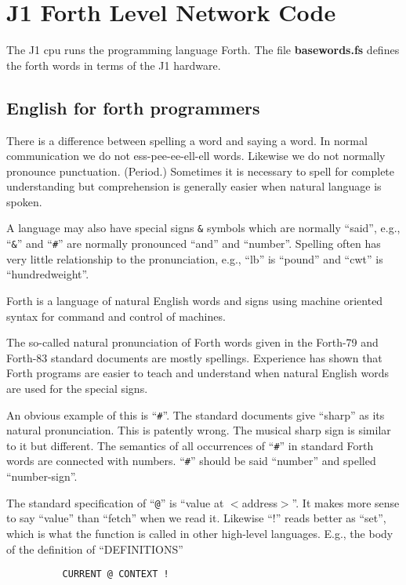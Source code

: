 \chapter{J1 Forth Level Network Code}
The J1 cpu runs the programming language Forth. The file {\bf basewords.fs}
defines the forth words in terms of the J1 hardware.

\section{English for forth programmers \cite{64}}

There is a difference between spelling a word and saying a word.  In
normal communication we do not ess-pee-ee-ell-ell words.  Likewise we
do not normally pronounce punctuation.  (Period.)  Sometimes it is
necessary to spell for complete understanding but comprehension is
generally easier when natural language is spoken.

A language may also have special signs \verb|&| symbols which are normally
``said'', e.g., ``\verb|&|'' and ``\verb|#|'' are normally pronounced
``and'' and ``number''.  Spelling often has very little relationship to
the pronunciation, e.g., ``lb'' is ``pound'' and ``cwt'' is ``hundredweight''.

Forth is a language of natural English words and signs using
machine  oriented  syntax for command and control of machines.

The so-called natural pronunciation of Forth words given in the
Forth-79 and Forth-83 standard documents are mostly spellings.
Experience has shown that Forth programs are easier to teach and
understand when natural English words are used for the special signs.

An obvious example of this is ``\verb|#|''.  The standard documents
give  ``sharp''  as  its natural pronunciation.  This is patently
wrong.  The musical sharp sign is similar to it but  different.
The semantics of all occurrences of ``\verb|#|'' in standard Forth words
are connected with numbers.  ``\verb|#|'' should be  said  ``number''  and
spelled ``number-sign''.

The standard specification of ``\verb|@|'' is ``value at $<$address$>$''.
It makes more sense to say ``value'' than ``fetch''  when  we  read
it.   Likewise  ``!''  reads  better  as ``set'', which is what the
function is called in other high-level  languages.   E.g.,  the
body of the definition of ``DEFINITIONS''
\begin{verbatim}
          CURRENT @ CONTEXT !
\end{verbatim}

